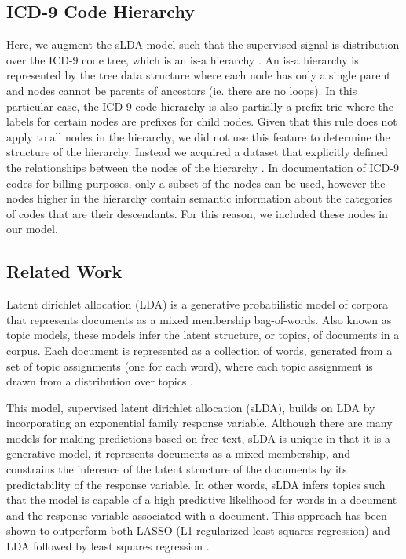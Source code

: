 \documentclass{article}
\begin{document}
\subsection{ICD-9 Code Hierarchy}

Here, we augment the sLDA model such that the supervised signal is
distribution over the ICD-9 code tree, which is an is-a hierarchy
\citep{ICD9NCBO}. An is-a hierarchy is represented by the tree data
structure where each node has only a single parent and nodes cannot
be parents of ancestors (ie. there are no loops). In this particular
case, the ICD-9 code hierarchy is also partially a prefix trie where
the labels for certain nodes are prefixes for child nodes. Given that
this rule does not apply to all nodes in the hierarchy, we did not
use this feature to determine the structure of the hierarchy. Instead
we acquired a dataset that explicitly defined the relationships between
the nodes of the hierarchy \citep{ICD9NCBO}. In documentation of
ICD-9 codes for billing purposes, only a subset of the nodes can be
used, however the nodes higher in the hierarchy contain semantic information
about the categories of codes that are their descendants. For this
reason, we included these nodes in our model.



\subsection{Related Work}
\label{sec:related_work}
Latent dirichlet allocation (LDA) is a generative probabilistic model
of corpora that represents documents as a mixed membership bag-of-words.
Also known as topic models, these models infer the latent structure,
or topics, of documents in a corpus. Each document is represented
as a collection of words, generated from a set of topic assignments
(one for each word), where each topic assignment is drawn from a distribution
over topics \citep{Blei2003}.

This model, supervised latent dirichlet allocation (sLDA), builds
on LDA by incorporating an exponential family response variable. Although
there are many models for making predictions based on free text, sLDA
is unique in that it is a generative model, it represents documents
as a mixed-membership, and constrains the inference of the latent
structure of the documents by its predictability of the response variable.
In other words, sLDA infers topics such that the model is capable
of a high predictive likelihood for words in a document and the response
variable associated with a document. This approach has been shown
to outperform both LASSO (L1 regularized least squares regression)
and LDA followed by least squares regression \citep{BleiMcAuliffe2008}.
\end{document}
